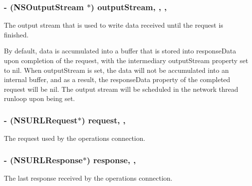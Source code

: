 \subsubsection[{output\+Stream}]{\setlength{\rightskip}{0pt plus 5cm}-\/ (N\+S\+Output\+Stream $\ast$) output\+Stream\hspace{0.3cm}{\ttfamily [read]}, {\ttfamily [write]}, {\ttfamily [nonatomic]}, {\ttfamily [strong]}}\label{interface_a_f_u_r_l_connection_operation_a6778c4ebc8739292f8aa0ebdffba0749}
The output stream that is used to write data received until the request is finished.

By default, data is accumulated into a buffer that is stored into {\ttfamily response\+Data} upon completion of the request, with the intermediary {\ttfamily output\+Stream} property set to {\ttfamily nil}. When {\ttfamily output\+Stream} is set, the data will not be accumulated into an internal buffer, and as a result, the {\ttfamily response\+Data} property of the completed request will be {\ttfamily nil}. The output stream will be scheduled in the network thread runloop upon being set. \hypertarget{interface_a_f_u_r_l_connection_operation_a5c453587e9d26f9e3ce3ac1e3c294d61}{}
\subsubsection[{request}]{\setlength{\rightskip}{0pt plus 5cm}-\/ (N\+S\+U\+R\+L\+Request$\ast$) request\hspace{0.3cm}{\ttfamily [read]}, {\ttfamily [nonatomic]}, {\ttfamily [strong]}}\label{interface_a_f_u_r_l_connection_operation_a5c453587e9d26f9e3ce3ac1e3c294d61}
The request used by the operation\textquotesingle{}s connection. \hypertarget{interface_a_f_u_r_l_connection_operation_ac7d24cbe5ff6720b0d5f330c840cb434}{}
\subsubsection[{response}]{\setlength{\rightskip}{0pt plus 5cm}-\/ (N\+S\+U\+R\+L\+Response$\ast$) response\hspace{0.3cm}{\ttfamily [read]}, {\ttfamily [nonatomic]}, {\ttfamily [strong]}}\label{interface_a_f_u_r_l_connection_operation_ac7d24cbe5ff6720b0d5f330c840cb434}
The last response received by the operation\textquotesingle{}s connection. \hypertarget{interface_a_f_u_r_l_connection_operation_aee9d9fd0cd4ff4cea1dd9f564ea487ef}{}
